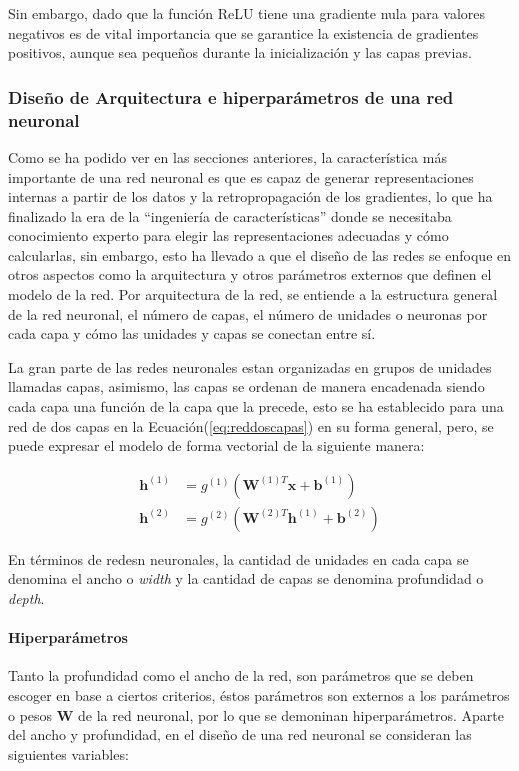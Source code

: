             Sin embargo, dado que la función ReLU tiene una gradiente nula para valores negativos es de vital importancia 
            que se garantice la existencia de gradientes positivos, aunque sea pequeños durante la inicialización y las capas 
            previas.

        \subsubsection{Diseño de Arquitectura e hiperparámetros de una red neuronal}
        Como se ha podido ver en las secciones anteriores, la característica más importante de una red neuronal es que es capaz
        de generar representaciones internas a partir de los datos y la retropropagación de los gradientes, lo que ha finalizado la era 
        de la ``ingeniería de características'' donde se necesitaba conocimiento experto para elegir las representaciones adecuadas y cómo calcularlas, sin embargo, esto 
        ha llevado a que el diseño de las redes se enfoque en otros aspectos como la arquitectura y otros parámetros externos 
        que definen el modelo de la red. Por arquitectura de la red, se entiende a la estructura general de la red neuronal, 
        el número de capas, el número de unidades o neuronas por cada capa y cómo las unidades y capas se conectan entre sí.

        La gran parte de las redes neuronales estan organizadas en grupos de unidades llamadas capas, asimismo, las capas se 
        ordenan de manera encadenada siendo cada capa una función de la capa que la precede, esto se ha establecido para una red de 
        dos capas en la Ecuación(\ref{eq:reddoscapas}) en su forma general, pero, se puede expresar el modelo de forma vectorial
        de la siguiente manera:

        \begin{align}
            \mathbf{h}^{(1)} &= g^{(1)} \left( \mathbf{W}^{(1)T}\mathbf{x} + \mathbf{b}^{(1)} \right) \\
            \mathbf{h}^{(2)} &= g^{(2)} \left( \mathbf{W}^{(2)T}\mathbf{h}^{(1)} + \mathbf{b}^{(2)} \right)
        \end{align}

        En términos de redesn neuronales, la cantidad de unidades en cada capa se denomina el ancho o \textit{width} 
        y la cantidad de capas se denomina profundidad o \textit{depth}.

            \paragraph{Hiperparámetros}
            Tanto la profundidad como el ancho de la red, son parámetros que se deben escoger en base a ciertos criterios, 
            éstos parámetros son externos a los parámetros o pesos $\mathbf{W}$ de la red neuronal, por lo que se demoninan
            hiperparámetros. Aparte del ancho y profundidad, en el diseño de una red neuronal se consideran las siguientes 
            variables:

